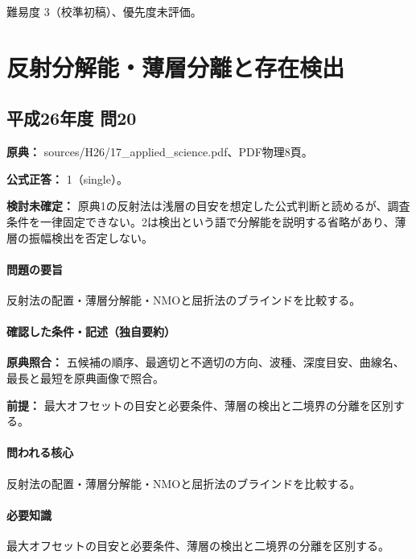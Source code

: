\par 難易度 3（校準初稿）、優先度未評価。

\section{反射分解能・薄層分離と存在検出}

\subsection{平成26年度 問20}
\label{q:h26-reg-applied-20}

\noindent\textbf{原典：} sources/H26/17\_applied\_science.pdf、PDF物理8頁。

\textbf{公式正答：} 1（single）。

\par\textbf{検討未確定：} 原典1の反射法は浅層の目安を想定した公式判断と読めるが、調査条件を一律固定できない。2は検出という語で分解能を説明する省略があり、薄層の振幅検出を否定しない。

\paragraph{問題の要旨} 反射法の配置・薄層分解能・NMOと屈折法のブラインドを比較する。

\paragraph{確認した条件・記述（独自要約）}\mbox{}\par

\noindent\textbf{原典照合：} 五候補の順序、最適切と不適切の方向、波種、深度目安、曲線名、最長と最短を原典画像で照合。\par

\noindent\textbf{前提：} 最大オフセットの目安と必要条件、薄層の検出と二境界の分離を区別する。\par

\paragraph{問われる核心} 反射法の配置・薄層分解能・NMOと屈折法のブラインドを比較する。

\paragraph{必要知識} 最大オフセットの目安と必要条件、薄層の検出と二境界の分離を区別する。

